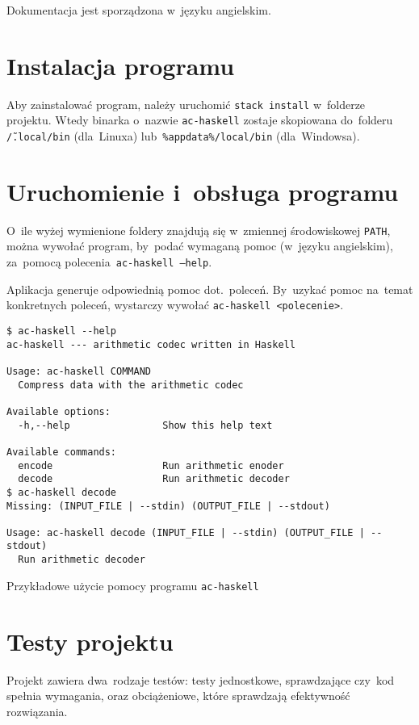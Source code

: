 \documentclass[../../praca.tex]{subfiles}
\begin{document}
Dokumentacja jest sporządzona w~języku angielskim.

\section{Instalacja programu}

Aby zainstalować program, należy uruchomić \texttt{stack install} 
w~folderze projektu. Wtedy binarka o~nazwie \texttt{ac-haskell}
zostaje skopiowana do~folderu \texttt{\~/.local/bin} (dla~Linuxa)
lub~\texttt{\%appdata\%/local/bin} (dla~Windowsa).

\section{Uruchomienie i~obsługa programu}

O~ile wyżej wymienione foldery znajdują się w~zmiennej środowiskowej
\texttt{PATH}, można wywołać program, by~podać wymaganą pomoc (w~języku angielskim),
za~pomocą polecenia~\texttt{ac-haskell --help}.

Aplikacja generuje odpowiednią pomoc dot.~poleceń. By~uzykać pomoc na~temat konkretnych
poleceń, wystarczy wywołać \texttt{ac-haskell <polecenie>}.

\begin{listing}
  \begin{verbatim}
$ ac-haskell --help
ac-haskell --- arithmetic codec written in Haskell

Usage: ac-haskell COMMAND
  Compress data with the arithmetic codec

Available options:
  -h,--help                Show this help text

Available commands:
  encode                   Run arithmetic enoder
  decode                   Run arithmetic decoder
$ ac-haskell decode
Missing: (INPUT_FILE | --stdin) (OUTPUT_FILE | --stdout)

Usage: ac-haskell decode (INPUT_FILE | --stdin) (OUTPUT_FILE | --stdout)
  Run arithmetic decoder
  \end{verbatim}
  \caption{Przykładowe użycie pomocy programu \texttt{ac-haskell}}
\end{listing}

\section{Testy projektu}

Projekt zawiera dwa~rodzaje testów: testy jednostkowe, sprawdzające
czy~kod spełnia wymagania, oraz obciążeniowe, które sprawdzają
efektywność rozwiązania.
\end{document}
